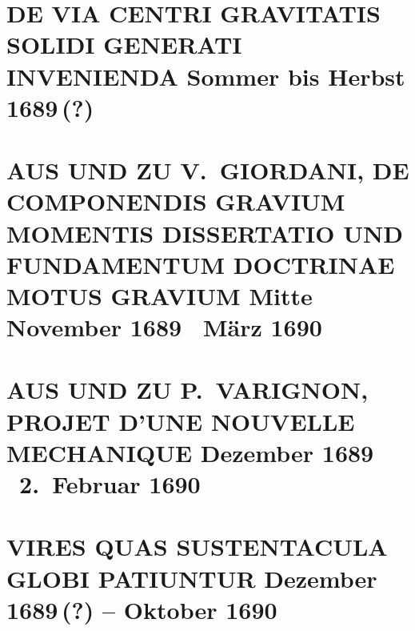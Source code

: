 \documentclass[%
fontsize=10pt,
]{scrbook}
\DeclareRobustCommand{\bracks}[1]{%
\textup{\lbrack}#1\textup{\rbrack}}
\begin{document}
\chapter[tocentry={De via centri gravitatis solidi generati invenienda
\enskip \bracks{Sommer bis Herbst 1689\,(?)}},
head={De via centri gravitatis solidi generati invenienda}]%
{\MakeUppercase{De via centri gravitatis solidi generati invenienda}
\newline \bracks{Sommer bis Herbst 1689\,(?)}}

\label{58657}
\label{58656-B}		%





\chapter[tocentry={Aus und zu V.~Giordani, De componendis gravium momentis dissertatio und Fundamentum doctrinae motus gravium
\enskip \bracks{Mitte November 1689 \textendash\ März 1690}%
},
head={Aus und zu Giordani, De componendis momentis und Fundamentum}]%
{\MakeUppercase{Aus und zu V.~Giordani, De componendis gravium momentis dissertatio und Fundamentum doctrinae motus gravium}
\newline \bracks{Mitte November 1689 \textendash\ März 1690}%
}

\label{58253}




\chapter[tocentry={Aus und zu P.~Varignon, Projet d'une nouvelle mechanique
\enskip \bracks{Dezember 1689 \textendash\ 2.~Februar 1690}
},
head={Aus und zu Varignon, Projet}]%
{\MakeUppercase{Aus und zu P.~Varignon, Projet d'une nouvelle mechanique}
\newline \bracks{Dezember 1689 \textendash\ 2.~Februar 1690}
}

\label{60365}





\chapter[tocentry={Vires quas sustentacula globi patiuntur 
\enskip \bracks{Dezember 1689\,(?) -- Oktober 1690}},
head={Vires quas sustentacula globi patiuntur}]
{\MakeUppercase{Vires quas sustentacula globi patiuntur}
\newline \bracks{Dezember 1689\,(?) -- Oktober 1690}}
\label{60115}

\end{document}
